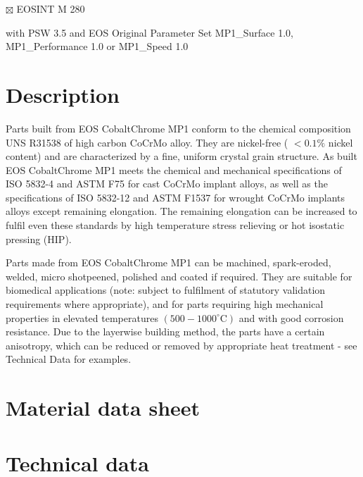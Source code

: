 \documentclass[10pt]{article}
\begin{document}
$\boxtimes$ EOSINT M 280

with PSW 3.5 and EOS Original Parameter Set MP1\_Surface 1.0, MP1\_Performance 1.0 or MP1\_Speed 1.0

\section*{Description}
Parts built from EOS CobaltChrome MP1 conform to the chemical composition UNS R31538 of high carbon CoCrMo alloy. They are nickel-free ( $<0.1 \%$ nickel content) and are characterized by a fine, uniform crystal grain structure. As built EOS CobaltChrome MP1 meets the chemical and mechanical specifications of ISO 5832-4 and ASTM F75 for cast CoCrMo implant alloys, as well as the specifications of ISO 5832-12 and ASTM F1537 for wrought CoCrMo implants alloys except remaining elongation. The remaining elongation can be increased to fulfil even these standards by high temperature stress relieving or hot isostatic pressing (HIP).

Parts made from EOS CobaltChrome MP1 can be machined, spark-eroded, welded, micro shotpeened, polished and coated if required. They are suitable for biomedical applications (note: subject to fulfilment of statutory validation requirements where appropriate), and for parts requiring high mechanical properties in elevated temperatures $\left(500-1000^{\circ} \mathrm{C}\right)$ and with good corrosion resistance. Due to the layerwise building method, the parts have a certain anisotropy, which can be reduced or removed by appropriate heat treatment - see Technical Data for examples.

\section*{Material data sheet}
\section*{Technical data}
\end{document}
